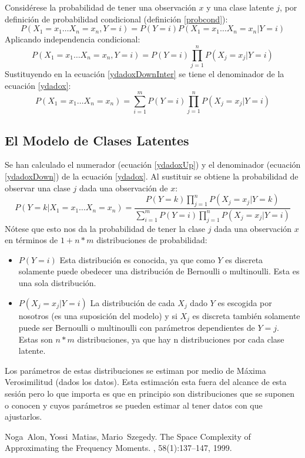\documentclass[11pt,spanish]{article}
\begin{document}
Considérese la probabilidad de tener una observación $x$ y una clase latente $j$, 
por definición de probabilidad condicional (definición \ref{probcond}):
\begin{equation*}
	P(X_1=x_1 \ldots X_n=x_n, Y=i) =  P(Y=i) P(X_1=x_1 \ldots X_n=x_n | Y=i)
\end{equation*}
Aplicando independencia condicional: 
\begin{equation*}
	P(X_1=x_1 \ldots X_n=x_n, Y=i) =  P(Y=i) \prod_{j=1}^{n} P(X_j=x_j | Y=i)
\end{equation*}
Sustituyendo en la ecuación \ref{ydadoxDownInter} se tiene el denominador de la ecuación \ref{ydadox}:  
\begin{equation}
	\label{ydadoxDown}
	P(X_1=x_1 \ldots X_n=x_n) = \sum_{i=1}^{m} P(Y=i) \prod_{j=1}^{n} P(X_j=x_j | Y=i)
\end{equation}

\subsection{El Modelo de Clases Latentes}

Se han calculado el numerador (ecuación \ref{ydadoxUp}) y el denominador (ecuación \ref{ydadoxDown}) de la ecuación \ref{ydadox}. 
Al sustituir se obtiene la probabilidad de observar una clase $j$ dada una observación de $x$: 
\begin{equation}
	\label{modelo}
	P(Y=k|X_1=x_1 \ldots X_n=x_n) = \frac{P(Y=k) \prod_{j=1}^{n} P(X_j=x_j|Y=k)}
		{ \sum_{i=1}^{m} P(Y=i) \prod_{j=1}^{n} P(X_j=x_j | Y=i) }
\end{equation}
Nótese que esto nos da la probabilidad de tener la clase $j$ dada una observación $x$ en términos de $1+n*m$ distribuciones de probabilidad:
\begin{itemize}
	\item {$P(Y=i)$} Esta distribución es conocida, ya que como $Y$ es discreta solamente puede obedecer una distribución de Bernoulli o multinoulli. Esta es una sola distribución. 
\item {$P(X_j=x_j | Y=i)$} La distribución de cada $X_j$ dado $Y$ es escogida por nosotros (es una suposición del modelo) y si $X_j$ es discreta también solamente puede ser Bernoulli o multinoulli con parámetros dependientes de $Y=j$. Estas son $n*m$ distribuciones, ya que hay n distribuciones por cada clase latente.
\end{itemize}

Los parámetros de estas distribuciones se estiman por medio de Máxima Verosimilitud (dados los datos). 
Esta estimación esta fuera del alcance de esta sesión pero 
lo que importa es que en principio son distribuciones que se suponen o conocen y 
cuyos parámetros se pueden estimar al tener datos con que ajustarlos.



\begin{thebibliography}{42}

Noga~Alon, Yossi~Matias, Mario~Szegedy.
\newblock The Space Complexity of Approximating the Frequency Moments.
, 58(1):137--147, 1999.

\end{thebibliography}
\end{document}
